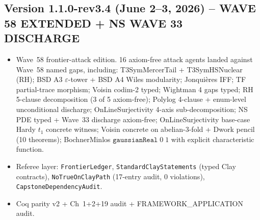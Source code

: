 \subsection*{Version 1.1.0-rev3.4 (June 2--3, 2026) -- WAVE 58 EXTENDED + NS WAVE 33 DISCHARGE}
\begin{itemize}
\item Wave~58 frontier-attack edition. 16 axiom-free attack
agents landed against Wave~58 named gaps, including: T3SymMercerTail
+ T3SymHSNuclear (RH); BSD A3 $\varepsilon$-tower + BSD A4 Wiles
modularity; Jonqui\`eres IFF; TF partial-trace morphism;
Voisin codim-2 typed; Wightman 4 gaps typed; RH 5-clause
decomposition (3 of 5 axiom-free); Polylog 4-clause +
enum-level unconditional discharge; OnLineSurjectivity 4-axis
sub-decomposition; NS PDE typed + Wave~33 discharge axiom-free;
OnLineSurjectivity base-case Hardy $t_1$ concrete witness; Voisin
concrete on abelian-3-fold + Dwork pencil (10 theorems);
BochnerMinlos $\texttt{gaussianReal}\;0\;1$ with explicit
characteristic function.
\item Referee layer: \texttt{FrontierLedger},
\texttt{StandardClayStatements} (typed Clay contracts),
\texttt{NoTrueOnClayPath} (17-entry audit, $0$ violations),
\texttt{CapstoneDependencyAudit}.
\item Coq parity v2 + Ch~1+2+19 audit + FRAMEWORK\_APPLICATION
audit.
\end{itemize}

